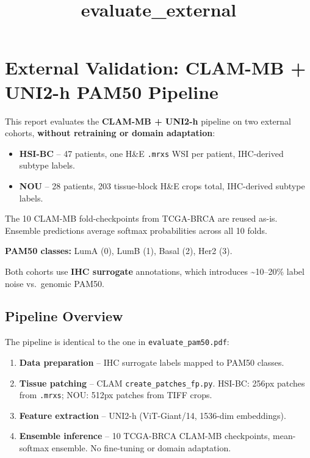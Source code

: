 \documentclass[11pt]{article}
\title{evaluate\_external}
\providecommand{\tightlist}{%
      \setlength{\itemsep}{0pt}\setlength{\parskip}{0pt}}
\begin{document}
    
    \maketitle
    
    

    
    \hypertarget{external-validation-clam-mb-uni2-h-pam50-pipeline}{%
\section{External Validation: CLAM-MB + UNI2-h PAM50
Pipeline}\label{external-validation-clam-mb-uni2-h-pam50-pipeline}}

This report evaluates the \textbf{CLAM-MB + UNI2-h} pipeline on two
external cohorts, \textbf{without retraining or domain adaptation}:

\begin{itemize}
\tightlist
\item
  \textbf{HSI-BC} -- 47 patients, one H\&E \texttt{.mrxs} WSI per
  patient, IHC-derived subtype labels.
\item
  \textbf{NOU} -- 28 patients, 203 tissue-block H\&E crops total,
  IHC-derived subtype labels.
\end{itemize}

The 10 CLAM-MB fold-checkpoints from TCGA-BRCA are reused as-is.
Ensemble predictions average softmax probabilities across all 10 folds.

\textbf{PAM50 classes:} LumA (0), LumB (1), Basal (2), Her2 (3).

Both cohorts use \textbf{IHC surrogate} annotations, which introduces
\textasciitilde{}10--20\% label noise vs.~genomic PAM50.

    \hypertarget{pipeline-overview}{%
\subsection{Pipeline Overview}\label{pipeline-overview}}

The pipeline is identical to the one in \texttt{evaluate\_pam50.pdf}:

\begin{enumerate}
\def\labelenumi{\arabic{enumi}.}
\tightlist
\item
  \textbf{Data preparation} -- IHC surrogate labels mapped to PAM50
  classes.
\item
  \textbf{Tissue patching} -- CLAM \texttt{create\_patches\_fp.py}.
  HSI-BC: 256px patches from \texttt{.mrxs}; NOU: 512px patches from
  TIFF crops.
\item
  \textbf{Feature extraction} -- UNI2-h (ViT-Giant/14, 1536-dim
  embeddings).
\item
  \textbf{Ensemble inference} -- 10 TCGA-BRCA CLAM-MB checkpoints,
  mean-softmax ensemble. No fine-tuning or domain adaptation.
\end{enumerate}
\end{document}
